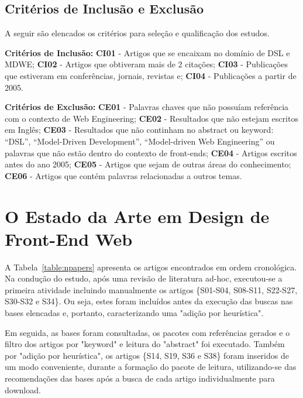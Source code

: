 \subsection{Critérios de Inclusão e Exclusão}

A seguir são elencados os critérios para seleção e qualificação dos estudos.


\textbf{Critérios de Inclusão:}
\textbf{CI01} - Artigos que se encaixam no domínio de DSL e MDWE;
\textbf{CI02} - Artigos que obtiveram mais de 2 citações;
\textbf{CI03} - Publicações que estiveram em conferências, jornais, revistas e;
\textbf{CI04} - Publicações a partir de 2005.

\textbf{Critérios de Exclusão:}
\textbf{CE01} - Palavras chaves que não possuíam referência com o contexto de Web Engineering;
\textbf{CE02} - Resultados que não estejam escritos em Inglês;
\textbf{CE03} - Resultados que não continham no abstract ou keyword: “DSL”, “Model-Driven Development”, “Model-driven Web Engineering” ou palavras que não estão dentro do contexto de front-ends;
\textbf{CE04} - Artigos escritos antes do ano 2005;
\textbf{CE05} - Artigos que sejam de outras áreas do conhecimento;
\textbf{CE06} - Artigos que  contém palavras relacionadas a outros temas.


\section{O Estado da Arte em Design de Front-End Web}
\label{sec:stateoftheart}

A Tabela~\ref{table:npapers} apresenta os artigos encontrados em ordem cronológica. Na condução do estudo, após uma revisão de literatura ad-hoc, executou-se a primeira atividade incluindo manualmente os artigos \{S01-S04, S08-S11, S22-S27, S30-S32 e S34\}. Ou seja, estes foram incluídos antes da execução das buscas nas bases elencadas e, portanto, caracterizando uma "adição por heurística". 

Em seguida, as bases foram consultadas, os pacotes com referências gerados e o filtro dos artigos por "keyword" e leitura do "abstract" foi executado. Também por "adição por heurística", os artigos \{S14, S19, S36 e S38\} foram inseridos de um modo conveniente, durante a formação do pacote de leitura, utilizando-se das recomendações das bases após a busca de cada artigo individualmente para download. 

